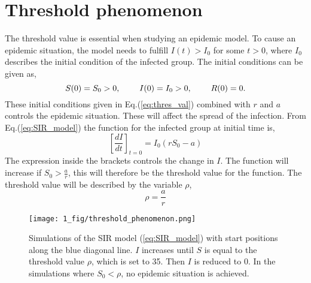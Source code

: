 \documentclass[%
twoside,                 %
final,                   %
chapterprefix=true,      %
open=right               %
10pt]{book}
\begin{document}
\section{Threshold phenomenon}
\label{section:1threshold_phenomenon}
The threshold value is essential when studying an epidemic model. To cause an epidemic situation, the model needs to fulfill $I(t)> I_0$ for some $t>0$, where $I_0$ describes the initial condition of  the infected group. The initial conditions can be given as,
\begin{equation} \label{eq:thres_val}
S(0)=S_0 > 0,\hspace{8mm} I(0)=I_0>0,\hspace{8mm} R(0) =0.
\end{equation}
These initial conditions given in Eq.(\ref{eq:thres_val}) combined with $r$ and $a$ controls the epidemic situation. These will affect the spread of the infection. From Eq.(\ref{eq:SIR_model}) the function for the infected group at initial time is,
\begin{equation}
\left[\frac{dI}{dt}\right]_{t=0} = I_0(rS_0-a)
\end{equation}
The expression inside the brackets controls the change in $I$. The function will increase if $S_0 > \frac{a}{r}$, this will therefore be the threshold value for the function. The threshold value will be described by the variable $\rho$,
\begin{equation} \label{eq:threshold_value}
\rho = \frac{a}{r}
\end{equation}


\begin{figure}[ht]
  \centerline{\texttt{[image: 1\_fig/threshold\_phenomenon.png]}}
  \caption{
  \label{fig:threshold_phenomenon} Simulations of the SIR model (\ref{eq:SIR_model}) with start positions along the blue diagonal line. $I$ increases until $S$ is equal to the threshold value $\rho$, which is set to 35. Then $I$ is reduced to 0. In the simulations where $S_0 < \rho$, no epidemic situation is achieved.
  }
\end{figure}
\end{document}
